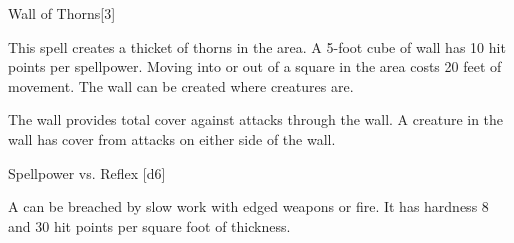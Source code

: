 \begin{spellsection}{Wall of Thorns}[3]
    \begin{spellheader}
    \end{spellheader}
    \begin{spellcontent}
        \begin{spelltargetinginfo}
        \end{spelltargetinginfo}
        \begin{spelleffects}
            \spelleffect This spell creates a thicket of thorns in the area. A 5-foot cube of wall has 10 hit points per spellpower. Moving into or out of a square in the area costs 20 feet of movement. The wall can be created where creatures are.

            The wall provides total cover against attacks through the wall. A creature in the wall has cover from attacks on either side of the wall.
            \spelldur \durshort
        \end{spelleffects}
    \end{spellcontent}
    \begin{spellsubcontent}
        \begin{spelltargetinginfo}
        \end{spelltargetinginfo}
        \begin{spelleffects}
            \begin{spellattack}{Spellpower vs. Reflex}
                \spellsuccess {}[d6]
            \end{spellattack}
        \end{spelleffects}
    \end{spellsubcontent}
    \begin{spellfooter}
        \spellnotes A  can be breached by slow work with edged weapons or fire. It has hardness 8 and 30 hit points per square foot of thickness.

        \physicalspellnotes
        \miscastexplode
    \end{spellfooter}
\end{spellsection}

